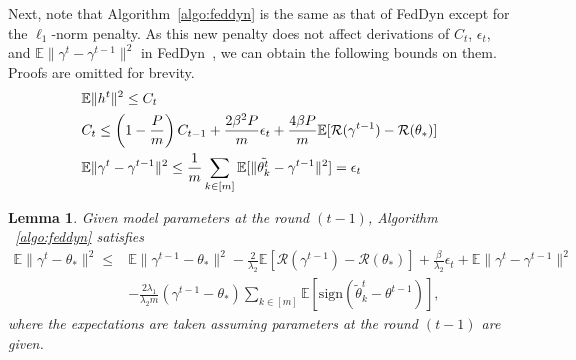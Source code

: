 \documentclass{article} %
\newtheorem{lemma}[theorem]{Lemma}
\begin{document}

Next, note that Algorithm~\ref{algo:feddyn} is the same as that of FedDyn except for the $\ell_1$-norm penalty. As this new penalty does not affect derivations of $C_t$, $\epsilon_t$, and $\mathbb{E}\lVert \gamma^t-\gamma^{t-1} \rVert^2$ in FedDyn~\citep{Acar2021federated}, we can obtain the following bounds on them. Proofs are omitted for brevity.%
\begin{align}
    &\mathbb{E}\lVert h^t \rVert^2 \le C_t\label{boundh}\\
    &C_t\label{boundC}\le \left(1-\frac{P}{m}\right) C_{t-1}+\frac{2\beta^2P}{m}\epsilon_t+\frac{4\beta P}{m}\mathbb{E}[\mathcal{R}(\gamma^{t-1})-\mathcal{R}(\theta_*)]\\
    &\mathbb{E}\lVert \gamma^t-\gamma^{t-1} \rVert^2 \label{MSEgamma}\le \frac{1}{m} \sum_{k\in [m]}\mathbb{E} [\lVert \Tilde{\theta_k^t}-\gamma^{t-1}\rVert ^2]=\epsilon_t
\end{align}
\begin{lemma}\label{msegammatheta}
Given model parameters at the round $(t-1)$, Algorithm ~\ref{algo:feddyn} satisfies
\begin{align}
    \mathbb{E}\lVert \gamma^t-\theta_* \rVert^2\le& 
    \mathbb{E}\lVert \gamma^{t-1}-\theta_* \rVert^2-\frac{2}{\lambda_2}\mathbb{E}[\mathcal{R}(\gamma^{t-1})-\mathcal{R}(\theta_*)]+\frac{\beta}{\lambda_2}\epsilon_t+\mathbb{E}\lVert \gamma^t-\gamma^{t-1} \rVert^2\\
    &-\frac{2\lambda_1}{\lambda_2 m}(\gamma^{t-1}-\theta_*)\sum_{k\in [m]}\mathbb{E}[\textrm{sign}(\tilde{\theta}_k^t-\theta^{t-1})],
\end{align}
where the expectations are taken assuming parameters at the round $(t-1)$ are given.
\end{lemma}
\end{document}
